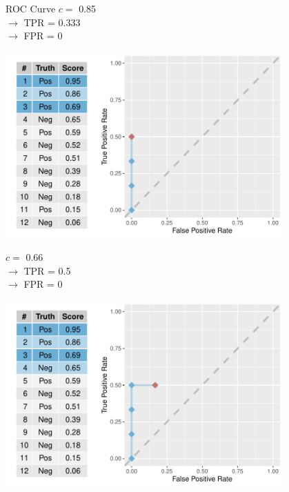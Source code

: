 \documentclass[11pt,compress,t,notes=noshow, xcolor=table]{beamer}
\newenvironment{knitrout}{}{} %
\begin{document}
\begin{vbframe}{ROC Curve}
$c =$ 0.85\\ 
$\rightarrow$ TPR = 0.333 \\
$\rightarrow$ FPR = 0

\framebreak

\begin{knitrout}\scriptsize
{}\color{fgcolor}

{\centering \includegraphics[width=0.8\textwidth]{figure/eval_mclass_roc_sp_7} 

}



\end{knitrout}

$c =$ 0.66\\ 
$\rightarrow$ TPR = 0.5 \\
$\rightarrow$ FPR = 0

\framebreak

\begin{knitrout}\scriptsize
{}\color{fgcolor}

{\centering \includegraphics[width=0.8\textwidth]{figure/eval_mclass_roc_sp_8}

}
\end{knitrout}
\end{vbframe}
\end{document}
